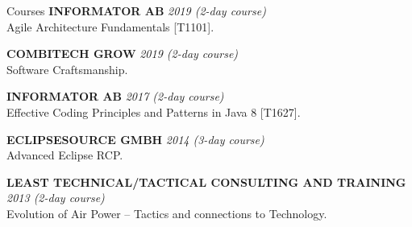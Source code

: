 \documentclass{resume}
\begin{document}
  \begin{rSection}{Courses}
  {\bf INFORMATOR AB}
    \hfill {\em 2019 (2-day course) } \\
    { Agile Architecture Fundamentals [T1101]. }

    {\bf COMBITECH GROW}
    \hfill {\em 2019 (2-day course) } \\
    { Software Craftsmanship. }

    {\bf INFORMATOR AB}
    \hfill {\em 2017 (2-day course) } \\
    { Effective Coding Principles and Patterns in Java 8 [T1627]. }

    {\bf ECLIPSESOURCE GMBH}
    \hfill {\em 2014 (3-day course) } \\
    { Advanced Eclipse RCP. }

    {\bf LEAST TECHNICAL/TACTICAL CONSULTING AND TRAINING}
    \hfill {\em 2013 (2-day course)} \\
    { Evolution of Air Power – Tactics and connections to Technology. }
  \end{rSection}
\end{document}
